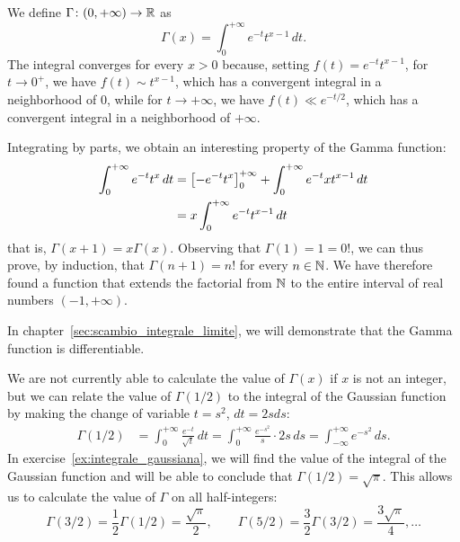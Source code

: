 \begin{example}%
  \label{ex:gamma_eulero}%
  We define $\Gamma\colon (0,+\infty) \to {\mathbb R}$ as
  \[
    \Gamma(x) = \int_0^{+\infty} e^{-t} t^{x-1}\, dt.
  \]
    The integral converges for every $x>0$ because, setting $f(t) = e^{-t}
  t^{x-1}$, for $t\to 0^+$, we have $f(t) \sim t^{x-1}$, which has a convergent
  integral in a neighborhood of $0$, while for $t\to +\infty$, we have $f(t) \ll
  e^{-t/2}$, which has a convergent integral in a neighborhood of $+\infty$.
  
  Integrating by parts, we obtain an interesting property of the Gamma function:
  \begin{align*}
  \int_0^{+\infty} e^{-t}t^{x}\, dt
  &= {\left[ -e^{-t}t^{x} \right]}_0^{+\infty}
  + \int_0^{+\infty} e^{-t}xt^{x-1}\, dt\\
  &= x\int_0^{+\infty} e^{-t}t^{x-1}\, dt
  \end{align*}
  that is, $\Gamma(x+1) = x\Gamma(x)$.
    Observing that $\Gamma(1)=1=0!$, we can thus prove, by induction, that
  $\Gamma(n+1) = n!$ for every $n\in {\mathbb N}$. We have therefore found a function
  that extends the factorial from ${\mathbb N}$ to the entire interval of real numbers
  $(-1,+\infty)$.
  
    In chapter~\ref{sec:scambio_integrale_limite}, we will demonstrate that the
  Gamma function is differentiable.
  
    We are not currently able to calculate the value of $\Gamma(x)$ if $x$ is
  not an integer, but we can relate the value of $\Gamma(1/2)$ to the integral
  of the Gaussian function by making the change of variable $t=s^2$, $dt=2s ds$:
  \begin{align*}
  \Gamma(1/2) 
  &= \int_0^{+\infty} \frac{e^{-t}}{\sqrt t}\, dt  
  = \int_0^{+\infty} \frac{e^{-s^2}}{s} \cdot 2s\, ds
  = \int_{-\infty}^{+\infty} e^{-s^2}\, ds.
  \end{align*}
    In exercise~\ref{ex:integrale_gaussiana}, we will find the value of the
  integral of the Gaussian function and will be able to conclude that
  $\Gamma(1/2) = \sqrt \pi$. This allows us to calculate the value of $\Gamma$
  on all half-integers:
  \[
  \Gamma(3/2) = \frac 1 2 \Gamma(1/2) = \frac{\sqrt \pi}{2}, \qquad
  \Gamma(5/2) = \frac 3 2 \Gamma(3/2) = \frac{3\sqrt \pi}{4}, \dots 
  \]
\end{example}
    
